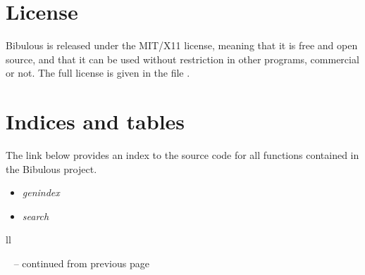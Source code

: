 \documentclass[letterpaper,10pt,english]{sphinxmanual}
\begin{document}
\section{License}
\label{index:license}
Bibulous is released under the MIT/X11 license, meaning that it is free and open source, and that it can be used without restriction in other programs, commercial or not. The full license is given in the file .


\section{Indices and tables}
\label{index:indices-and-tables}
The link below provides an index to the source code for all functions contained in the Bibulous project.
\begin{itemize}
\item {} 
\emph{genindex}

\item {} 
\emph{search}

\end{itemize}

\begin{longtable}{ll}
\hline
\endfirsthead

%
{{\textsf{\tablename\ \thetable{} -- continued from previous page}}} \\
\hline
\endhead

\hline {} \\ \hline
\endfoot

\endlastfoot

\hline\end{longtable}




\renewcommand{\indexname}{Index}
\printindex
\end{document}
